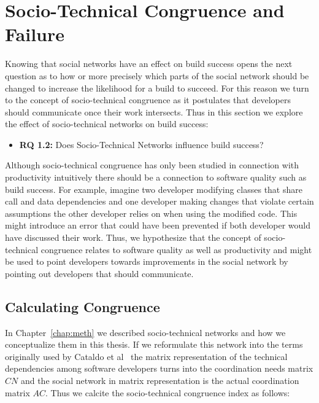 \section{Socio-Technical Congruence and Failure}
\label{chap:stc-net2}
Knowing that social networks have an effect on build success opens the next question as to how or more precisely which parts of the social network should be changed to increase the likelihood for a build to succeed.
For this reason we turn to the concept of socio-technical congruence as it postulates that developers should communicate once their work intersects.
Thus in this section we explore the effect of socio-technical networks on build success:

\begin{itemize}
  \item\textbf{RQ 1.2:} Does Socio-Technical Networks influence build success?
\end{itemize}

Although socio-technical congruence has only been studied in connection with productivity intuitively there should be a connection to software quality such as build success.
For example, imagine two developer modifying classes that share call and data dependencies and one developer making changes that violate certain assumptions the other developer relies on when using the modified code.
This might introduce an error that could have been prevented if both developer would have discussed their work.
Thus, we hypothesize that the concept of socio-technical congruence relates to software quality as well as productivity and might be used to point developers towards improvements in the social network by pointing out developers that should communicate.



\subsection{Calculating Congruence}
\label{sec:congruence}
In Chapter~\ref{chap:meth} we described socio-technical networks and how we conceptualize them in this thesis.
If we reformulate this network into the terms originally used by Cataldo et al~\cite{cataldo:cscw:2006} the matrix representation of the technical dependencies among software developers turns into the coordination needs matrix $CN$ and the social network in matrix representation is the actual coordination matrix $AC$.
Thus we calcite the socio-technical congruence index as follows:

